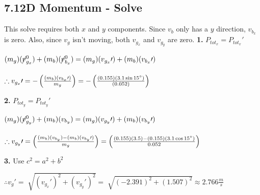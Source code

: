 \subsection*{7.1\hspace*{0.5cm}2D Momentum - Solve}
This solve requires both $x$ and $y$ components. Since $v_{b}$ only has a $y$ direction, $v_{b_{x}}$ is zero. Also, since $v_{g}$ isn't moving, both $v_{g_{x}}$ and $v_{g_{y}}$ are zero.\newline\newline
\textbf{1.} $P_{tot_{x}} = P_{tot_{x}}\prime$ \\
\begin{adjustwidth}{0.6cm}{0pt}
    $(m_{g})(\cancel{v}_{g_{x}}^0) + (m_{b})(\cancel{v}_{b_{x}}^0) = (m_{g})(v_{g_{x}}\prime) + (m_{b})(v_{b_{x}}\prime)$ \\\\
    $\therefore v_{g_{x}}\prime = -\left(\frac{(m_{b})(v_{b_{x}}\prime)}{m_{g}}\right) = -\left(\frac{(0.155)(3.1\sin15\degree)}{(0.052)}\right)$
\end{adjustwidth}\vspace*{15pt}
\textbf{2.} $P_{tot_{y}} = P_{tot_{y}}\prime$ \\
\begin{adjustwidth}{0.6cm}{0pt}
    $(m_{g})(\cancel{v}_{g_{y}}^0) + (m_{b})(v_{b_{y}}) = (m_{g})(v_{g_{y}}\prime) + (m_{b})(v_{b_{y}}\prime)$ \\\\
    $\therefore v_{g_{y}}\prime = \left(\frac{(m_{b})(v_{b_{y}}) - (m_{b})(v_{b_{y}}\prime)}{m_{g}}\right) = \left(\frac{(0.155)(3.5) - (0.155)(3.1\cos15\degree)}{0.052}\right)$
\end{adjustwidth}\vspace*{15pt}
\noindent\textbf{3.} Use $c^2 = a^2 + b^2$ \\
\begin{adjustwidth}{0.6cm}{0pt}
    $\therefore v_{g}\prime = \sqrt[]{{(v_{g_{x}}\prime)}^2 + {(v_{g_{y}}\prime)}^2} = \sqrt[]{{(-2.391)}^2 + {(1.507)}^2} \approx 2.766 \frac{m}{s} $
\end{adjustwidth}